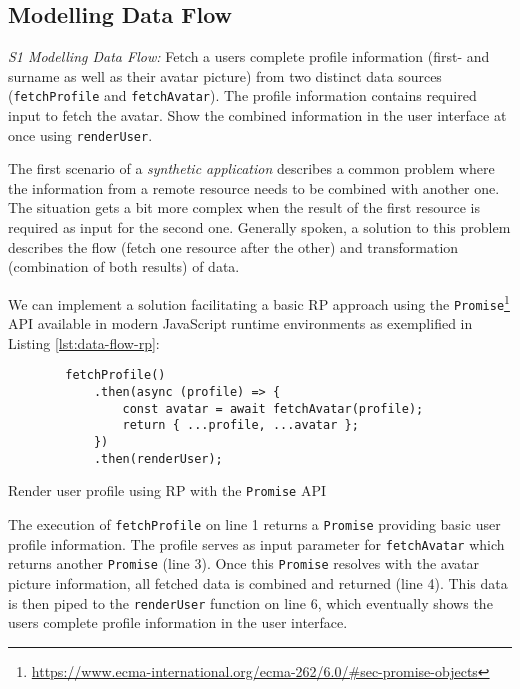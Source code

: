 \documentclass[12pt,a4paper]{article}
\begin{document}
\subsection{Modelling Data Flow}

\begin{framed}
	\noindent\emph{S1 Modelling Data Flow:} Fetch a users complete profile information (first- and surname as well as their avatar picture) from two distinct data sources (\texttt{fetchProfile} and \texttt{fetchAvatar}). The profile information contains required input to fetch the avatar. Show the combined information in the user interface at once using \texttt{renderUser}.
\end{framed}

The first scenario of a \emph{synthetic application} \cite{7827078} describes a common problem where the information from a remote resource needs to be combined with another one. The situation gets a bit more complex when the result of the first resource is required as input for the second one. Generally spoken, a solution to this problem describes the flow (fetch one resource after the other) and transformation (combination of both results) of data.

We can implement a solution facilitating a basic RP approach using the \texttt{Promise}\footnote{\url{https://www.ecma-international.org/ecma-262/6.0/\#sec-promise-objects}} API available in modern JavaScript runtime environments as exemplified in Listing \ref{lst:data-flow-rp}:

\begin{listing}[H]
	\begin{verbatim}
		fetchProfile()
			.then(async (profile) => {
				const avatar = await fetchAvatar(profile);
				return { ...profile, ...avatar };
			})
			.then(renderUser);
	\end{verbatim}
	\caption{Render user profile using RP with the \texttt{Promise} API}
	\label{lst:data-flow-rp}
\end{listing}

The execution of \texttt{fetchProfile} on line 1 returns a \texttt{Promise} providing basic user profile information. The profile serves as input parameter for \texttt{fetchAvatar} which returns another \texttt{Promise} (line 3). Once this \texttt{Promise} resolves with the avatar picture information, all fetched data is combined and returned (line 4). This data is then piped to the \texttt{renderUser} function on line 6, which eventually shows the users complete profile information in the user interface.
\end{document}
